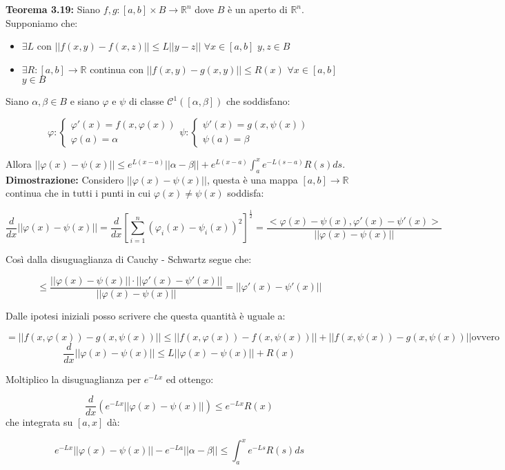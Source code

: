 \documentclass[a4paper,11pt,titlepage]{book}
\begin{document}
\textbf{Teorema 3.19:} Siano $f,g:[a,b]\times B\to\mathbb{R}^n$ dove $B$ è un aperto di $\mathbb{R}^n$. Supponiamo che:
\begin{itemize}
\item $\exists L$ con $||f(x,y)-f(x,z)||\leq L||y-z||$ $\forall x\in[a,b]$ $y,z\in B$
\item $\exists R:[a,b]\to\mathbb{R}$ continua con $||f(x,y)-g(x,y)||\leq R(x)$ $\forall x\in[a,b]$ $y\in B$
\end{itemize}
Siano $\alpha,\beta\in B$ e siano $\varphi$ e $\psi$ di classe $\mathcal{C}^1([\alpha,\beta])$ che soddisfano: 

$$\varphi:\begin{cases} \varphi'(x)=f(x,\varphi(x))\\ \varphi(a)=\alpha\end{cases} \psi:\begin{cases} \psi'(x)=g(x,\psi(x))\\ \psi(a)=\beta\end{cases}$$

Allora $||\varphi(x)-\psi(x)||\leq e^{L(x-a)}||\alpha-\beta||+e^{L(x-a)}\int_a^x e^{-L(s-a)}R(s)ds$.\\

\textbf{Dimostrazione:} Considero $||\varphi(x)-\psi(x)||$, questa è una mappa $[a,b]\to\mathbb{R}$ continua che in tutti i punti in cui $\varphi(x)\ne\psi(x)$ soddisfa:

$$\frac{d}{dx}||\varphi(x)-\psi(x)||=\frac{d}{dx}\left[ \sum_{i=1}^n(\varphi_i(x)-\psi_i(x))^2\right]^{\frac{1}{2}}=\frac{<\varphi(x)-\psi(x),\varphi'(x)-\psi'(x)>}{||\varphi(x)-\psi(x)||}$$

Così dalla disuguaglianza di Cauchy - Schwartz segue che:

$$\leq\frac{||\varphi(x)-\psi(x)||\cdot||\varphi'(x)-\psi'(x)||}{||\varphi(x)-\psi(x)||}=||\varphi'(x)-\psi'(x)||$$

Dalle ipotesi iniziali posso scrivere che questa quantità è uguale a:

$$=||f(x,\varphi(x))-g(x,\psi(x))||\leq ||f(x,\varphi(x))-f(x,\psi(x))||+||f(x,\psi(x))-g(x,\psi(x))||\mbox{ovvero}$$ $$\frac{d}{dx}||\varphi(x)-\psi(x)||\leq L||\varphi(x)-\psi(x)||+R(x)$$

Moltiplico la disuguaglianza per $e^{-Lx}$ ed ottengo:

$$\frac{d}{dx}(e^{-Lx}||\varphi(x)-\psi(x)||)\leq e^{-Lx}R(x)$$ che integrata su $[a,x]$ dà:

$$ e^{-Lx}||\varphi(x)-\psi(x)||-e^{-La}||\alpha-\beta||\leq\int_a^xe^{-Ls}R(s)ds$$ 
\end{document}
